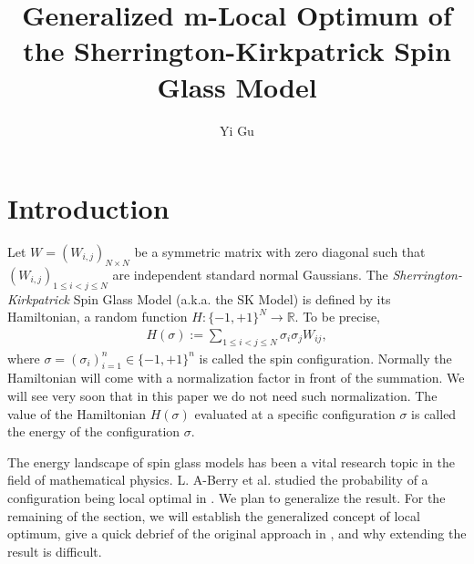 \documentclass[10pt]{article}
\author{Yi Gu}
\newenvironment{Proof of lemma}{\noindent{\bf Proof of Lemma}}{\hfill$\Box$\newline}
\newenvironment{Proof of claim}{\noindent{\bf Proof of claim}}{\hfill$\Box$\newline}
\newenvironment{Proof of theorem}{\noindent{\bf Proof of Theorem}}{\hfill\scriptsize{$\Box$}\newline}
\newenvironment{Proof of theorems}{\noindent{\bf Proof of Theorems}}{\hfill$\Box$\newline}
\newenvironment{Proof of proposition}{\noindent{\bf Proof of Proposition}}{\hfill$\Box$\newline}
\newenvironment{Proof of propositions}{\noindent{\bf Proof of Propositions}}{\hfill$\Box$\newline}
\newenvironment{Proof of exercise}{\noindent{\it Proof of Exercise:}}{\hfill$\Box$}
\numberwithin{equation}{section}
\begin{document}
\title{Generalized m-Local Optimum of the Sherrington-Kirkpatrick Spin Glass Model}
\maketitle

\section{Introduction} \label{sec_intro}
Let $W = (W_{i,j})_{N\times N}$ be a symmetric matrix with zero diagonal such that $(W_{i,j})_{1 \leq i < j \leq N}$ are independent standard normal Gaussians. The \textit{Sherrington-Kirkpatrick} Spin Glass Model (a.k.a. the SK Model) is defined by its Hamiltonian, a random function $H:\{-1,+1\}^N \to \mathbb{R}$. To be precise,
\begin{align}
    H(\sigma) := \sum_{1 \leq i < j \leq N} \sigma_i \sigma_j W_{ij},
\end{align}
where $\sigma = (\sigma_i)^n_{i=1} \in \{-1,+1\}^n$ is called the spin configuration. Normally the Hamiltonian will come with a normalization factor in front of the summation. We will see very soon that in this paper we do not need such normalization. The value of the Hamiltonian $H(\sigma)$ evaluated at a specific configuration $\sigma$ is called the energy of the configuration $\sigma$.

The energy landscape of spin glass models has been a vital research topic in the field of mathematical physics. L. A-Berry et al. studied the probability of a configuration being local optimal in \cite{SK_optimal}. We plan to generalize the result. For the remaining of the section, we will establish the generalized concept of local optimum, give a quick debrief of the original approach in \cite{SK_optimal}, and why extending the result is difficult.
\end{document}

